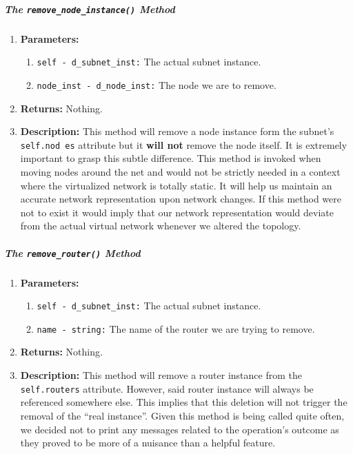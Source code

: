         \subparagraph{The \texttt{remove\_node\_instance()} Method}
            \begin{enumerate}
                \item \textbf{Parameters:}
                \begin{enumerate}
                    \item \texttt{self - d\_subnet\_inst:} The actual subnet instance.
                    \item \texttt{node\_inst - d\_node\_inst:} The node we are to remove.
                \end{enumerate}
                \item \textbf{Returns:} Nothing.
                \item \textbf{Description:} This method will remove a node instance form the subnet's \texttt{self.nod es} attribute but it \textbf{will not} remove the node itself. It is extremely important to grasp this subtle difference. This method is invoked when moving nodes around the net and would not be strictly needed in a context where the virtualized network is totally static. It will help us maintain an accurate network representation upon network changes. If this method were not to exist it would imply that our network representation would deviate from the actual virtual network whenever we altered the topology.
            \end{enumerate}

        \subparagraph{The \texttt{remove\_router()} Method}
            \begin{enumerate}
                \item \textbf{Parameters:}
                \begin{enumerate}
                    \item \texttt{self - d\_subnet\_inst:} The actual subnet instance.
                    \item \texttt{name - string:} The name of the router we are trying to remove.
                \end{enumerate}
                \item \textbf{Returns:} Nothing.
                \item \textbf{Description:} This method will remove a router instance from the \texttt{self.routers} attribute. However, said router instance will always be referenced somewhere else. This implies that this deletion will not trigger the removal of the ``real instance''. Given this method is being called quite often, we decided not to print any messages related to the operation's outcome as they proved to be more of a nuisance than a helpful feature.
            \end{enumerate}

